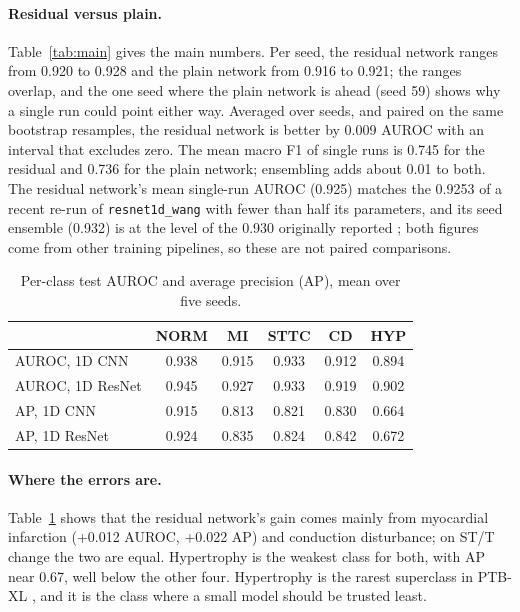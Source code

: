 \documentclass[11pt,a4paper]{article}
\newcommand{\code}[1]{\texttt{#1}}
\begin{document}
\paragraph{Residual versus plain.} Table~\ref{tab:main} gives the main numbers. Per seed, the residual network
ranges from 0.920 to 0.928 and the plain network from 0.916 to 0.921; the ranges overlap, and the one seed where
the plain network is ahead (seed 59) shows why a single run could point either way. Averaged over seeds, and
paired on the same bootstrap resamples, the residual network is better by 0.009 AUROC with an interval that excludes
zero. The mean macro F1 of single runs is 0.745 for the residual and 0.736 for the plain network; ensembling adds
about 0.01 to both. The residual network's mean single-run AUROC (0.925) matches the 0.9253 of a recent re-run of
\code{resnet1d\_wang} \citep{abreu2025code2} with fewer than half its parameters, and its seed ensemble (0.932)
is at the level of the 0.930 originally reported \citep{strodthoff2021benchmarks}; both figures come from other
training pipelines, so these are not paired comparisons.

\begin{table}[t]
\centering
\caption{Per-class test AUROC and average precision (AP), mean over five seeds.}
\label{tab:labels}
\small
\begin{tabular}{lccccc}
\toprule
 & NORM & MI & STTC & CD & HYP \\
\midrule
AUROC, 1D CNN    & 0.938 & 0.915 & 0.933 & 0.912 & 0.894 \\
AUROC, 1D ResNet & 0.945 & 0.927 & 0.933 & 0.919 & 0.902 \\
AP, 1D CNN       & 0.915 & 0.813 & 0.821 & 0.830 & 0.664 \\
AP, 1D ResNet    & 0.924 & 0.835 & 0.824 & 0.842 & 0.672 \\
\bottomrule
\end{tabular}
\end{table}

\paragraph{Where the errors are.} Table~\ref{tab:labels} shows that the residual network's gain comes mainly from
myocardial infarction (+0.012 AUROC, +0.022 AP) and conduction disturbance; on ST/T change the two are equal.
Hypertrophy is the weakest class for both, with AP near 0.67, well below the other four. Hypertrophy is the rarest
superclass in PTB-XL \citep{wagner2020ptbxl}, and it is the class where a small model should be trusted least.
\end{document}
